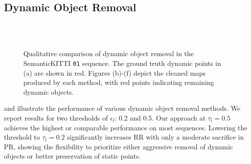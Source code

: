 \subsection{Dynamic Object Removal}



\begin{figure}[!t]
    \centering
     \\
     \\
    \caption{Qualitative comparison of dynamic object removal in the SemanticKITTI \cite{behley2019semantickitti} \texttt{01} sequence. The ground truth dynamic points in (a) are shown in red. Figures (b)-(f) depict the cleaned maps produced by each method, with red points indicating remaining dynamic objects.}
    \label{fig:result_dynamic_removal}
    \vspace{-5mm}
\end{figure}

 and  illustrate the performance of various dynamic object removal methods. We report results for two thresholds of $\epsilon_l$: 0.2 and 0.5. Our approach at $\tau_{l} = 0.5$ achieves the highest or comparable performance on most sequences. Lowering the threshold to $\tau_{l} = 0.2$ significantly increases RR with only a moderate sacrifice in PR, showing the flexibility to prioritize either aggressive removal of dynamic objects or better preservation of static points.

